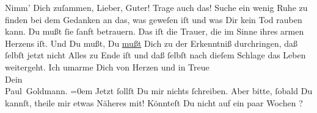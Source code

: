 \begin{ledgroupsized}[t]{13cm}
               Nimm’ Dich zuſammen, Lieber, Guter! Trage auch das! Suche ein wenig Ruhe zu finden
               bei dem Gedanken an das, was geweſen iſt und was Dir kein Tod rauben kann. {\pb}Du mußt ſie ſanft betrauern. Das iſt die Trauer, die im Sinne ihres
               armen Herzens iſt. Und Du mußt, Du \uline{mußt} Dich zu der
               Erkenntniß durchringen, daß ſelbſt jetzt nicht Alles zu Ende iſt und daß ſelbſt nach
               dieſem Schlage das Leben weitergeht.\pend
           \pstart
           Ich umarme Dich von Herzen und in Treue {\\[\baselineskip]}Dein {\\[\baselineskip]}\spacefill\mbox{Paul Goldmann.}\pend
           \leftskip=0em{}\pstart
           \noindent{}Jetzt ſollſt Du mir nichts ſchreiben. Aber bitte, ſobald Du kannſt, theile mir
                  etwas Näheres mit!\pend
           \pstart
           Könnteſt Du nicht auf ein paar Wochen \label{K_L02870-3v}\label{K_L02870-3h}?\pend
           
         
         \endnumbering{}\end{ledgroupsized}  \newcommand{\dateiname}{L02870}\newcommand{\titel}{Paul Goldmann an Arthur Schnitzler, 20. 3. [1899]}\newcommand{\editorInnen}{Martin Anton Müller und Laura Untner}
      